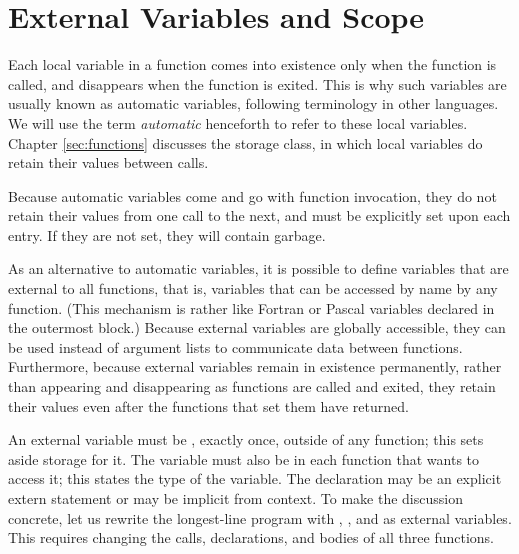 \section{External Variables and Scope}


Each local variable in a function comes into existence only when the function is called, and disappears when the function is exited.
This is why such variables are usually known as automatic variables, following terminology in other languages.
We will use the term \emph{automatic} henceforth to refer to these local variables.
Chapter \ref{sec:functions} discusses the  storage class, in which local variables do retain their values between calls.

Because automatic variables come and go with function invocation, they do not retain their values from one call to the next, and must be explicitly set upon each entry.
If they are not set, they will contain garbage.

As an alternative to automatic variables, it is possible to define variables that are external to all functions, that is, variables that can be accessed by name by any function.
(This mechanism is rather like Fortran  or Pascal variables declared in the outermost block.)
Because external variables are globally accessible, they can be used instead of argument lists to communicate data between functions.
Furthermore, because external variables remain in existence permanently, rather than appearing and disappearing as functions are called and exited, they retain their values even after the functions that set them have returned.

An external variable must be , exactly once, outside of any function; this sets aside storage for it.
The variable must also be  in each function that wants to access it; this states the type of the variable.
The declaration may be an explicit extern statement or may be implicit from context.
To make the discussion concrete, let us rewrite the longest-line program with , , and  as external variables.
This requires changing the calls, declarations, and bodies of all three functions.

